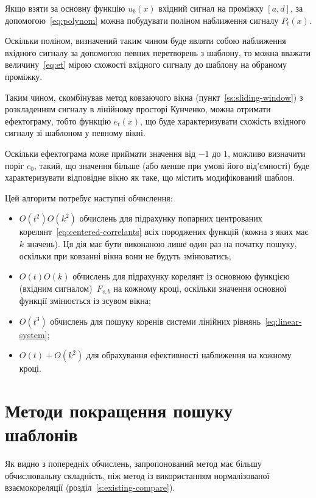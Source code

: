     Якщо взяти за основну функцію $u_b(x)$ вхідний сигнал на проміжку ${[a,d]}$, за допомогою~\eqref{eq:polynom} можна
    побудувати поліном наближення сигналу $P_t(x)$.

    Оскільки поліном, визначений таким чином буде являти собою наближення вхідного сигналу за допомогою певних
    перетворень з шаблону, то можна вважати величину~\eqref{eq:et} мірою схожості вхідного сигналу до шаблону на
    обраному проміжку.

    Таким чином, скомбінував метод ковзаючого вікна (пункт~\ref{ss:sliding-window}) з розкладенням сигналу в
    лінійному просторі Кунченко, можна отримати ефектограму, тобто функцію $e_t(x)$, що буде характеризувати схожість
    вхідного сигналу зі шаблоном у певному вікні.

    Оскільки ефектограма може приймати значення від $-1$ до $1$, можливо визначити поріг $e_0$, такий, що значення
    більше (або менше при умові його від’ємності) буде характеризувати відповідне вікно як таке, що містить
    модифікований шаблон.

    Цей алгоритм потребує наступні обчислення:
    \begin{itemize}
        \item $O(t^2) O(k^2)$ обчислень для підрахунку попарних центрованих корелянт~\eqref{eq:centered-correlants}
            всіх породжених функцій (кожна з яких має $k$ значень).
            Ця дія має бути виконаною лише один раз на початку пошуку, оскільки при ковзанні вікна вони не будуть
            змінюватись;
        \item $O(t) O(k)$ обчислень для підрахунку корелянт із основною функцією (вхідним сигналом)~$F_{v,b}$ на
            кожному кроці, оскільки значення основної функції змінюється із зсувом вікна;
        \item $O(t^3)$ обчислень для пошуку коренів системи лінійних рівнянь~\eqref{eq:linear-system};
        \item $O(t) + O(k^2)$ для обрахування ефективності наближення на кожному кроці.
    \end{itemize}

\section{Методи покращення пошуку шаблонів}
    Як видно з попередніх обчислень, запропонований метод має більшу обчислювальну складність, ніж метод із
    використанням нормалізованої взаємокореляції (розділ~\ref{s:existing-compare}).

